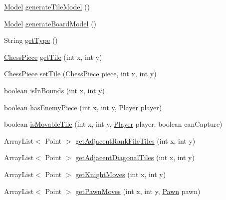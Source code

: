 \begin{DoxyCompactItemize}
\item 
\hyperlink{classview_1_1loaders_1_1structures_1_1_model}{Model} \hyperlink{classmodel_1_1board_1_1_rectangular_board_a871d89a154bd3628e00504bd91747109}{generate\-Tile\-Model} ()
\item 
\hyperlink{classview_1_1loaders_1_1structures_1_1_model}{Model} \hyperlink{classmodel_1_1board_1_1_rectangular_board_a62edb43eeaeef48c7fd6994806bfc5a4}{generate\-Board\-Model} ()
\item 
String \hyperlink{classmodel_1_1board_1_1_rectangular_board_ae31cbebd45c2e8eb4c0f27a2b31ec290}{get\-Type} ()
\item 
\hyperlink{classmodel_1_1_chess_piece}{Chess\-Piece} \hyperlink{classmodel_1_1board_1_1_rectangular_board_a31120dd8c4e3cb47201a39333945c438}{get\-Tile} (int x, int y)
\item 
\hyperlink{classmodel_1_1_chess_piece}{Chess\-Piece} \hyperlink{classmodel_1_1board_1_1_rectangular_board_a9a77e49749feb9211f8a70e43d12cf4d}{set\-Tile} (\hyperlink{classmodel_1_1_chess_piece}{Chess\-Piece} piece, int x, int y)
\item 
boolean \hyperlink{classmodel_1_1board_1_1_rectangular_board_ac462656a89172957d6970476b4e39bf1}{is\-In\-Bounds} (int x, int y)
\item 
boolean \hyperlink{classmodel_1_1board_1_1_rectangular_board_addce7bd7a463bb3f279df0022ed4a46f}{has\-Enemy\-Piece} (int x, int y, \hyperlink{classcontroller_1_1_player}{Player} player)
\item 
boolean \hyperlink{classmodel_1_1board_1_1_rectangular_board_a4e238edb6b8308d8b561f6418d15e594}{is\-Movable\-Tile} (int x, int y, \hyperlink{classcontroller_1_1_player}{Player} player, boolean can\-Capture)
\item 
Array\-List$<$ Point $>$ \hyperlink{classmodel_1_1board_1_1_rectangular_board_a58a8b1a8a8505340bd2e6dd2f3268aaa}{get\-Adjacent\-Rank\-File\-Tiles} (int x, int y)
\item 
Array\-List$<$ Point $>$ \hyperlink{classmodel_1_1board_1_1_rectangular_board_a43e4180539d99a0b95cf2957b4d43eb2}{get\-Adjacent\-Diagonal\-Tiles} (int x, int y)
\item 
Array\-List$<$ Point $>$ \hyperlink{classmodel_1_1board_1_1_rectangular_board_a32fbc2d65ed36077c051b05d3c305f1f}{get\-Knight\-Moves} (int x, int y)
\item 
Array\-List$<$ Point $>$ \hyperlink{classmodel_1_1board_1_1_rectangular_board_a6323cde6b4f30594520205dfab7fbcba}{get\-Pawn\-Moves} (int x, int y, \hyperlink{classmodel_1_1pieces_1_1_pawn}{Pawn} pawn)

\end{DoxyCompactItemize}
